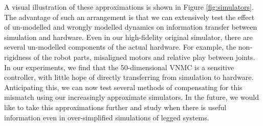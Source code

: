 A visual illustration of these approximations is shown in Figure \ref{fig:simulators}. The advantage of such an arrangement is that we can extensively test the effect of un-modelled and wrongly modelled dynamics on information transfer between simulation and hardware. Even in our high-fidelity original simulator, there are several un-modelled components of the actual hardware. For example, the non-rigidness of the robot parts, misaligned motors and relative play between joints. In our experiments, we find that the 50-dimensional VNMC is a sensitive controller, with little hope of directly transferring from simulation to hardware. Anticipating this, we can now test several methods of compensating for this mismatch using our increasingly approximate simulators. In the future, we would like to take this approximations further and study when there is useful information even in over-simplified simulations of legged systems.


